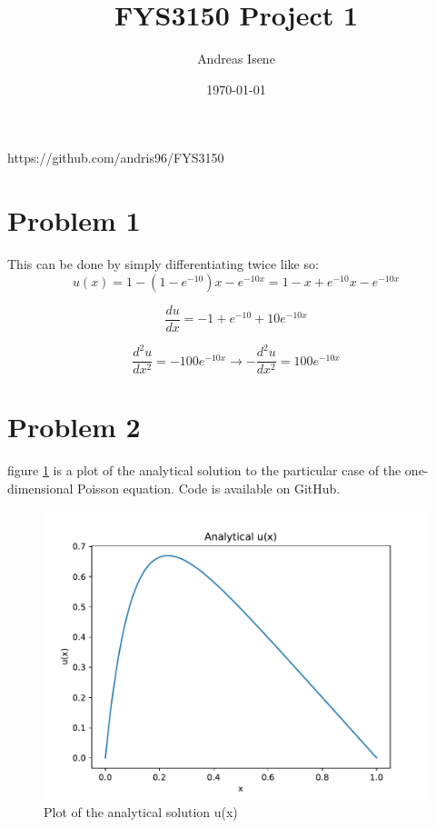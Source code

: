 \documentclass[english,notitlepage]{revtex4-1}
\begin{document}
	
	\title{FYS3150 Project 1}      
	\author{Andreas Isene}         
	\date{\today}                             
	\noaffiliation                          
	
	
	\maketitle 
	
	https://github.com/andris96/FYS3150
		 
	\section*{Problem 1}
	This can be done by simply differentiating twice like so:
	\[ u(x) = 1-(1-e^{-10})x-e^{-10x} = 1 - x + e^{-10}x-e^{-10x}\]
	
	\[\frac{du}{dx} =-1+e^{-10}+10e^{-10x}\]
	
	\[\frac{d^2u}{dx^2} = -100e^{-10x}\rightarrow -\frac{d^2u}{dx^2} = 100e^{-10x}\]
	
	\section*{Problem 2}
	
	figure \ref{fig:data_plott} is a plot of the analytical solution to the particular case of the one-dimensional Poisson equation. Code is available on GitHub.
	
	\begin{figure}[h!]
		\centering 
		\includegraphics[scale=0.55]{data_plott.pdf}
		\caption{Plot of the analytical solution u(x)}
		\label{fig:data_plott}
	\end{figure}
\end{document}
